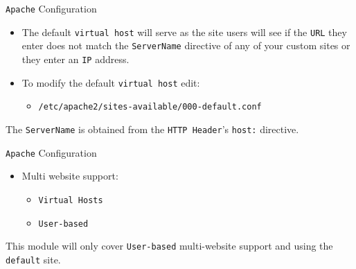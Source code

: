 \documentclass[xcolor=table]{beamer}
\begin{document}
\begin{frame}{\texttt{Apache} Configuration}
  \begin{itemize}
    \item The default \texttt{virtual host} will serve as the site users will see if the \texttt{URL} they enter does not match the \texttt{ServerName} directive of any of your custom sites or they enter an \texttt{IP} address. 
    \item To modify the default \texttt{virtual host} edit:
      \begin{itemize}
        \item \texttt{/etc/apache2/sites-available/000-default.conf}
      \end{itemize}
  \end{itemize}
  \begin{tcolorbox}
    \begin{center}
      \scriptsize The \texttt{ServerName} is obtained from the \texttt{HTTP Header}'s \texttt{host:} directive.
    \end{center}
  \end{tcolorbox}
\end{frame}

\begin{frame}{\texttt{Apache} Configuration}
  \begin{itemize}
    \item Multi website support:
      \begin{itemize}
        \item \texttt{Virtual Hosts}
        \item \texttt{User-based}
      \end{itemize}
  \end{itemize}
  \begin{tcolorbox}
    \begin{center}
      \scriptsize This module will only cover \texttt{User-based} multi-website support and using the \texttt{default} site.
    \end{center}
  \end{tcolorbox}
\end{frame}
\end{document}
